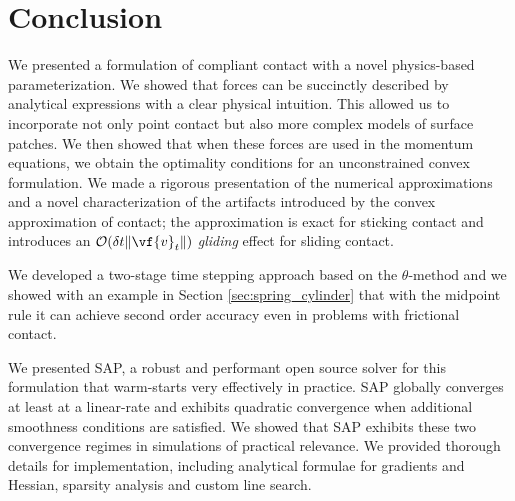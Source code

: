 \section{Conclusion}
\label{sec:future_directions}

We presented a formulation of compliant contact with a novel physics-based
parameterization. We showed that forces can be succinctly described by
analytical expressions with a clear physical intuition. This allowed us to
incorporate not only point contact but also more complex models of surface
patches. We then showed that when these forces are used in the momentum
equations, we obtain the optimality conditions for an unconstrained convex
formulation. We made a rigorous presentation of the numerical approximations and
a novel characterization of the artifacts introduced by the convex approximation
of contact; the approximation is exact for sticking contact and introduces an
$\mathcal{O}(\delta t\|\vf{v}_t\|)$ \emph{gliding} effect for sliding contact.

We developed a two-stage time stepping approach based on the
$\theta\text{-method}$ and we showed with an example in Section
\ref{sec:spring_cylinder} that with the midpoint rule it can achieve second
order accuracy even in problems with frictional contact. 


We presented SAP, a robust and performant open source solver for this
formulation that warm-starts very effectively in practice. SAP globally
converges at least at a linear-rate and exhibits quadratic convergence when
additional smoothness conditions are satisfied. We showed that SAP exhibits
these two convergence regimes in simulations of practical relevance. We provided
thorough details for implementation, including analytical formulae for gradients
and Hessian, sparsity analysis and custom line search.

